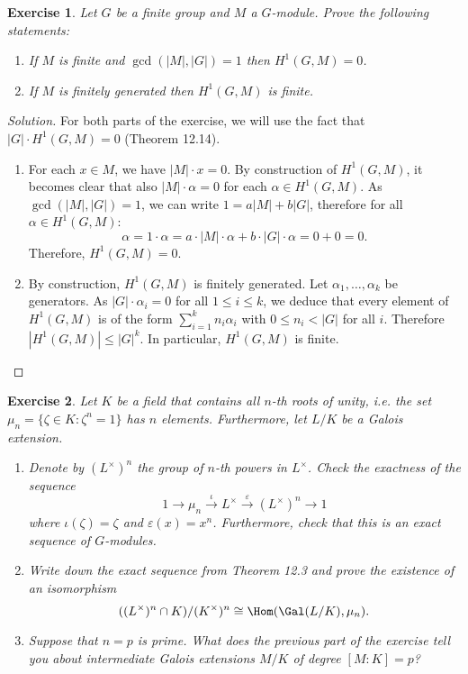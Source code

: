 \documentclass[a4paper,10pt,reqno]{amsart}
\newtheorem{ex}{Exercise}[section]
\newenvironment{sol}
  {\renewcommand\qedsymbol{$\blacksquare$}\begin{proof}[Solution]}
  {\end{proof}}
\begin{document}
\begin{ex}
\label{12.4}Let $G$ be a finite group and $M$ a $G$-module. Prove the following statements:
    \begin{enumerate}[label=(\roman*)]
    \item If $M$ is finite and $\gcd(|M|,|G|) = 1$ then $H^1(G,M) = 0$.
    \item If $M$ is finitely generated then $H^1(G,M)$ is finite.
    \end{enumerate}
\end{ex}

\begin{sol}
    For both parts of the exercise, we will use the fact that $|G| \cdot H^1(G,M) = 0$ (Theorem 12.14).

    \begin{enumerate}[label=(\roman*)]

    \item For each $x \in M$, we have $|M| \cdot x = 0$. By construction of $H^1(G,M)$, it becomes clear that also $|M| \cdot \alpha = 0$ for each $\alpha \in H^1(G,M)$. As $\gcd(|M|,|G|) = 1$, we can write $1 = a|M| + b|G|$, therefore for all $\alpha \in H^1(G,M)$:
    \[
    \alpha = 1 \cdot \alpha = a \cdot |M| \cdot \alpha + b \cdot |G| \cdot \alpha = 0 + 0 = 0.
    \]
    Therefore, $H^1(G,M) = 0$.
    \item By construction, $H^1(G,M)$ is finitely generated. Let $\alpha_1, \ldots, \alpha_k$ be generators. As $|G| \cdot \alpha_i = 0$ for all $1 \leq i \leq k$, we deduce that every element of $H^1(G,M)$ is of the form $\sum_{i=1}^kn_i \alpha_i$ with $0 \leq n_i < |G|$ for all $i$. Therefore $|H^1(G,M)| \leq |G|^k$. In particular, $H^1(G,M)$ is finite.\qedhere
    \end{enumerate}
    
\end{sol}

\begin{ex}
\label{12.5}
    Let $K$ be a field that contains all $n$-th roots of unity, i.e. the set $\mu_n = \{ \zeta \in K: \zeta^n = 1 \}$ has $n$ elements. Furthermore, let $L/K$ be a Galois extension.
    \begin{enumerate}[label=(\roman*)]
    \item Denote by $(L^{\times})^n$ the group of $n$-th powers in $L^{\times}$. Check the exactness of the sequence
    \[
    1 \longrightarrow \mu_n \overset{\iota}{\longrightarrow} L^{\times} \overset{\varepsilon}{\longrightarrow} (L^{\times})^n \to 1
    \]
    where $\iota(\zeta) = \zeta$ and $\varepsilon(x) = x^n$. Furthermore, check that this is an exact sequence of $G$-modules.
    \item Write down the exact sequence from Theorem 12.3 and prove the existence of an isomorphism
    \[
    ((L^{\times})^n \cap K)/(K^{\times})^n \cong \Hom(\Gal(L/K),\mu_n).
    \]
    \item Suppose that $n=p$ is prime. What does the previous part of the exercise tell you about intermediate Galois extensions $M/K$ of degree $[M:K] = p$?
    \end{enumerate}
\end{ex}
\end{document}

